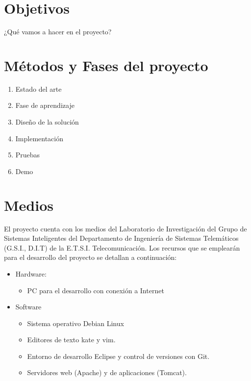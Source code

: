 \documentclass[a4paper,11pt]{report}
\begin{document}
\chapter*{Objetivos}
¿Qué vamos a hacer en el proyecto?

\chapter*{Métodos y Fases del proyecto}
\begin{enumerate}
  \item Estado del arte
  \item Fase de aprendizaje
  \item Diseño de la solución
  \item Implementación
  \item Pruebas
  \item Demo
\end{enumerate}

\chapter*{Medios}

El proyecto cuenta con los medios del Laboratorio de Investigación del Grupo de
Sistemas Inteligentes del Departamento de Ingeniería de Sistemas Telemáticos (G.S.I.,
D.I.T) de la E.T.S.I. Telecomunicación. Los recursos que se emplearán para el desarrollo
del proyecto se detallan a continuación:
\begin{itemize}
  \item Hardware:
  \begin{itemize}
    \item PC para el desarrollo con conexión a Internet
  \end{itemize}
  \item Software
  \begin{itemize}
    \item Sistema operativo Debian Linux
    \item Editores de texto kate y vim.
    \item Entorno de desarrollo Eclipse y control de versiones con Git.
    \item Servidores web (Apache) y de aplicaciones (Tomcat).
  \end{itemize}
\end{itemize}

\nocite{*}
 
{
\small

}
\end{document}
